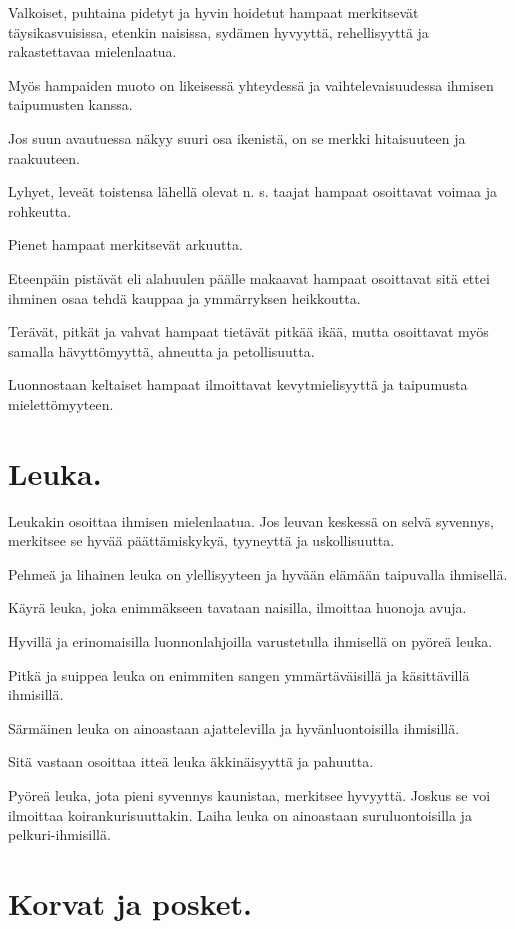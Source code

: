 \documentclass[11pt, twoside, finnish, a5paper]{book}
\begin{document}
Valkoiset, puhtaina pidetyt ja hyvin hoidetut hampaat
merkitsevät täysikasvuisissa, etenkin naisissa, sydämen hyvyyttä,
rehellisyyttä ja rakastettavaa mielenlaatua.

Myös hampaiden muoto on likeisessä yhteydessä ja
vaihtelevaisuudessa ihmisen taipumusten kanssa.

Jos suun avautuessa näkyy suuri osa ikenistä, on se
merkki hitaisuuteen ja raakuuteen.

Lyhyet, leveät toistensa lähellä olevat  n. s. taajat
hampaat osoittavat voimaa ja rohkeutta.

Pienet hampaat merkitsevät arkuutta.

Eteenpäin pistävät eli alahuulen päälle makaavat hampaat
osoittavat sitä ettei ihminen osaa tehdä kauppaa ja
ymmärryksen heikkoutta.

Terävät, pitkät ja  vahvat hampaat tietävät
pitkää ikää, mutta osoittavat myös samalla hävyttömyyttä,
ahneutta ja petollisuutta.

Luonnostaan keltaiset hampaat ilmoittavat
kevytmielisyyttä ja taipumusta mielettömyyteen.

\chapter*{Leuka.}

Leukakin osoittaa ihmisen mielenlaatua. Jos leuvan
keskessä on selvä syvennys, merkitsee se hyvää
päättämiskykyä, tyyneyttä ja uskollisuutta.

Pehmeä ja lihainen leuka on ylellisyyteen ja hyvään
elämään taipuvalla ihmisellä.

Käyrä leuka, joka enimmäkseen tavataan naisilla,
ilmoittaa huonoja avuja.

Hyvillä ja erinomaisilla luonnonlahjoilla varustetulla
ihmisellä on pyöreä leuka.

Pitkä ja suippea leuka on enimmiten sangen
ymmärtäväisillä ja käsittävillä ihmisillä.

Särmäinen leuka on ainoastaan ajattelevilla
ja hyvänluontoisilla ihmisillä.

Sitä vastaan osoittaa itteä leuka äkkinäisyyttä  ja pahuutta.

Pyöreä leuka, jota pieni syvennys kaunistaa, merkitsee
hyvyyttä. Joskus se voi ilmoittaa koirankurisuuttakin.
Laiha leuka on ainoastaan suruluontoisilla
ja pelkuri-ihmisillä.

\chapter*{Korvat ja posket.}
\end{document}
